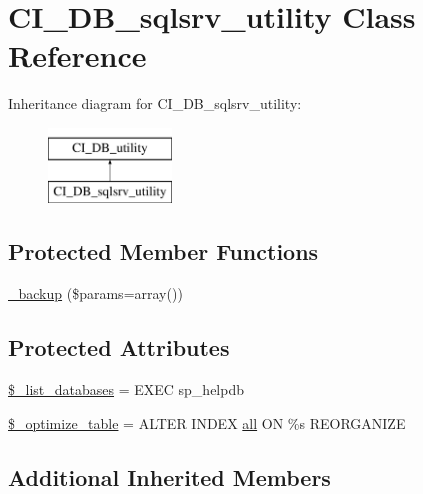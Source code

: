 \hypertarget{class_c_i___d_b__sqlsrv__utility}{}\section{C\+I\+\_\+\+D\+B\+\_\+sqlsrv\+\_\+utility Class Reference}
\label{class_c_i___d_b__sqlsrv__utility}
Inheritance diagram for C\+I\+\_\+\+D\+B\+\_\+sqlsrv\+\_\+utility\+:\begin{figure}[H]
\begin{center}
\leavevmode
\includegraphics[height=2.000000cm]{class_c_i___d_b__sqlsrv__utility}
\end{center}
\end{figure}
\subsection*{Protected Member Functions}
\begin{DoxyCompactItemize}
\item 
\hyperlink{class_c_i___d_b__sqlsrv__utility_a30f3053d2c82e7562349924363507afa}{\+\_\+backup} (\$params=array())
\end{DoxyCompactItemize}
\subsection*{Protected Attributes}
\begin{DoxyCompactItemize}
\item 
\hyperlink{class_c_i___d_b__sqlsrv__utility_afe3a5b80562d93d6bc7e2b53c95b7e5a}{\$\+\_\+list\+\_\+databases} = \textquotesingle{}E\+X\+E\+C sp\+\_\+helpdb\textquotesingle{}
\item 
\hyperlink{class_c_i___d_b__sqlsrv__utility_a083199e5c22c78912dae0a47bb2d7fad}{\$\+\_\+optimize\+\_\+table} = \textquotesingle{}A\+L\+T\+E\+R I\+N\+D\+E\+X \hyperlink{change_team_8php_a5f3fcf87333f5770d16608f67ad88d19}{all} O\+N \%s R\+E\+O\+R\+G\+A\+N\+I\+Z\+E\textquotesingle{}
\end{DoxyCompactItemize}
\subsection*{Additional Inherited Members}


